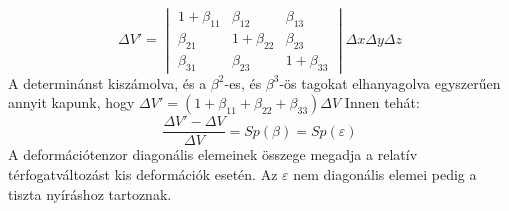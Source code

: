 \documentclass[a4paper,12pt]{article}
\begin{document}
\begin{equation}
\Delta V'=\begin{vmatrix}
1+\beta_{11} & \beta_{12} & \beta_{13} \\
\beta_{21} & 1+\beta_{22} & \beta_{23} \\
\beta_{31} & \beta_{23} & 1+\beta_{33}
\end{vmatrix}\Delta x\Delta y\Delta z
\end{equation}
A determinánst kiszámolva, és a $\beta^2$-es, és $\beta^3$-ös tagokat elhanyagolva egyszerűen annyit kapunk, hogy $\Delta V'=(1+\beta_{11}+\beta_{22}+\beta_{33})\Delta V$ Innen tehát:
\begin{equation}
\frac{\Delta V'-\Delta V}{\Delta V}=Sp(\beta)=Sp(\varepsilon)
\end{equation}
A deformációtenzor diagonális elemeinek összege megadja a relatív térfogatváltozást kis deformációk esetén. Az $\varepsilon$ nem diagonális elemei pedig a tiszta nyíráshoz tartoznak.
\end{document}

